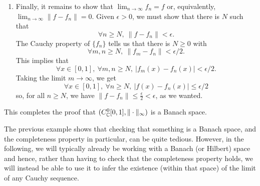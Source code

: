 \begin{example}
\begin{enumerate}
      It is the Cauchy property of \(\{f_n\}\) that comes to save the day.
      There is an \(N\in\N\) such that
      \begin{equation}
        \forall x\in[0,1], \ \forall m,n\geq N,\ |f_m(x)-f_n(x)| <
        \epsilon / 4
      \end{equation}
      Taking \(n=N\) and \(m\to\infty\), we obtain
      \begin{equation}
        \forall x\in[0,1], \ |f(x)-f_N(x)|\leq \epsilon / 4 < \epsilon /
        3,
      \end{equation}
      which is what we needed.
    \item
      Finally, it remains to show that $\lim_{n\to \infty}f_n=f$ or,
      equivalently, \(\lim_{n\to\infty}\|f-f_n\|=0\).
      Given \(\epsilon>0\), we must show that there is \(N\) such that
      \begin{equation}
        \forall n\geq N,\ \|f-f_n\| < \epsilon
      .\end{equation}
      The Cauchy property of \(\{f_n\}\) tells us
      that there is \(N\geq 0\) with
      \begin{equation}
        \forall m,n\geq N,\ \|f_m-f_n\|<\epsilon / 2
      .\end{equation}
      This implies that
      \begin{equation}
        \forall x\in[0,1],\ \forall m,n\geq N,\ |f_m(x)-f_n(x)|<\epsilon
        / 2
      .\end{equation}
      Taking the limit \(m\to\infty\), we get
      \begin{equation}
        \forall x\in[0,1],\ \forall n\geq N,\ |f(x)-f_n(x)|\leq \epsilon
        / 2
      \end{equation}
      so, for all \(n\geq N\), we have \(\|f-f_n\|\leq
      \frac{\epsilon}{2}<\epsilon \), as we wanted.
  \end{enumerate}
  This completes the proof that $(C^0_{\mathbb{C}}[0,1],\|\cdot\|_{\infty})$ is a
  Banach space.
\end{example}

\begin{remark}
The previous example shows that checking that something is a Banach space, and the completeness property in particular, can be quite tedious. However, in the following, we will typically already be working with a Banach (or Hilbert) space and hence, rather than having to check that the completeness property holds, we will instead be able to use it to infer the existence (within that space) of the limit of any Cauchy sequence.
\end{remark}

